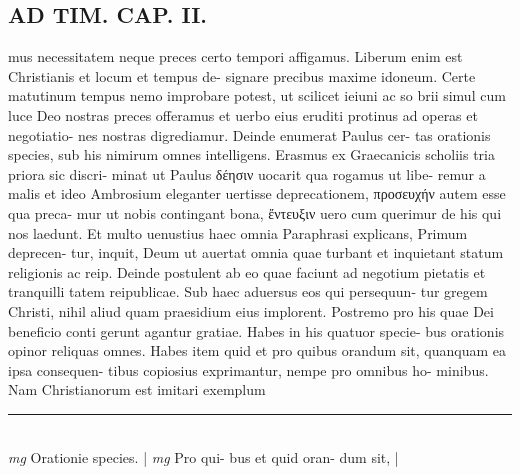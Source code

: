 \documentclass{article}
\begin{document}
\begin{pages}
\section*{AD TIM. CAP. II. }
\marginpar{[ p.112 ]}\pstart mus necessitatem neque preces certo tempori affigamus. Liberum enim est Christianis et locum et tempus de- signare precibus maxime idoneum. Certe matutinum tempus nemo improbare potest, ut scilicet ieiuni ac so brii simul cum luce Deo nostras preces offeramus et uerbo eius eruditi protinus ad operas et negotiatio- nes nostras digrediamur. Deinde enumerat Paulus cer- tas orationis species, sub his nimirum omnes intelligens. Erasmus ex Graecanicis scholiis tria priora sic discri- minat ut Paulus δέησιν uocarit qua rogamus ut libe- remur a malis et ideo Ambrosium eleganter uertisse deprecationem, προσευχήν autem esse qua preca- mur ut nobis contingant bona, ἔντευξιν uero cum querimur de his qui nos laedunt. Et multo uenustius haec omnia Paraphrasi explicans, Primum deprecen- tur, inquit, Deum ut auertat omnia quae turbant et inquietant statum religionis ac reip. Deinde postulent ab eo quae faciunt ad negotium pietatis et tranquilli tatem reipublicae. Sub haec aduersus eos qui persequun- tur gregem Christi, nihil aliud quam praesidium eius implorent. Postremo pro his quae Dei beneficio conti gerunt agantur gratiae. Habes in his quatuor specie- bus orationis opinor reliquas omnes. Habes item quid et pro quibus orandum sit, quanquam ea ipsa consequen- tibus copiosius exprimantur, nempe pro omnibus ho- minibus. Nam Christianorum est imitari exemplum  \pend
\vspace{0.5cm}\noindent
\vspace{0.2cm}\rule{1cm}{0.2pt}\\ 
\hspace{0.2cm}\textit{mg}
\footnotesize Orationie species. 
\normalsize| 
\hspace{0.2cm}\textit{mg}
\footnotesize Pro qui- bus et quid oran- dum sit, 
\normalsize| 

\end{pages}
\end{document}
